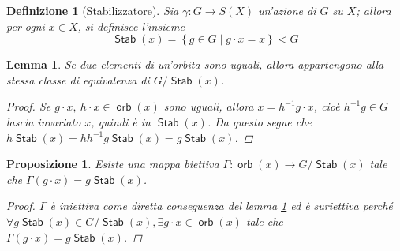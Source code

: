 \documentclass[11pt]{scrartcl}
\theoremstyle{style1}
\newtheorem{prop}{Proposizione}[section]
\newtheorem{lemma}{Lemma}[teorema]
\newtheorem{definizione}{Definizione}[section]
\numberwithin{equation}{subsection}
\renewcommand{\operatorname}[1]{\mathop{\mathrm{\textsf{#1}}}}
\begin{document}
\begin{definizione}
	[Stabilizzatore]
	Sia $\gamma: G \to S(X)$ un'azione di $G$ su $X$; allora per ogni $x \in X$, si definisce l'insieme 
	\[
	\operatorname{Stab} (x) = \left\{ g \in G  \mid g \cdot  x = x \right\} < G 
	\] 	
\end{definizione}
\begin{lemma}\label{l111}
Se due elementi di un'orbita sono uguali, allora appartengono alla stessa classe di equivalenza di $G / \operatorname{Stab} (x)$.
\begin{proof}
	Se $g \cdot x, \ h\cdot x \in \operatorname{orb} (x)$ sono uguali, allora $x =h^{-1} g \cdot x $, cio\`e $h^{-1} g \in G$ lascia invariato $x$, quindi \`e in $\operatorname{Stab} (x)$.
	Da questo segue che $h \operatorname{Stab} (x) = h h^{-1} g \operatorname{Stab} (x) = g \operatorname{Stab} (x)$.
\end{proof}
\end{lemma}
\begin{prop}
	Esiste una mappa biettiva $\Gamma : \operatorname{orb} (x) \to G / \operatorname{Stab} (x)$ tale che $\Gamma(g \cdot x) = g \operatorname{Stab} (x)$.
	\begin{proof}
		$\Gamma$ \`e iniettiva come diretta conseguenza del lemma \ref{l111} ed \`e suriettiva perch\'e $\forall g \operatorname{Stab} (x) \in G / \operatorname{Stab} (x), \exists g\cdot x \in \operatorname{orb} (x)$ tale che $\Gamma(g\cdot x) = g \operatorname{Stab} (x)$.
	\end{proof}
\end{prop}
\end{document}
